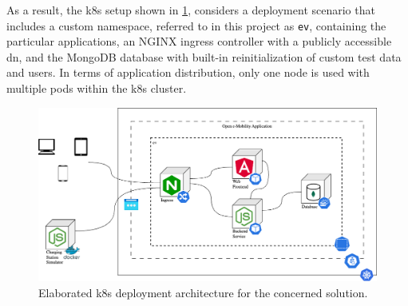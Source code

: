 \newpage

\noindent As a result, the \acrshort{k8s} setup shown in \ref{fig:k8s-setup}, considers a deployment scenario that includes a custom namespace, referred to in this project as \verb|ev|, containing the particular applications, an NGINX ingress controller with a publicly accessible \acrshort{dn}, and the MongoDB database with built-in reinitialization of custom test data and users.
In terms of application distribution, only one node is used with multiple pods within the \acrshort{k8s} cluster.

\begin{figure}[h]
    \centering
    \includegraphics[scale=0.4]{resources/images/main/3_approach/KubernetesDeployment.png}
    \caption{Elaborated \acrshort{k8s} deployment architecture for the concerned solution.}
    \label{fig:k8s-setup}
\end{figure}
